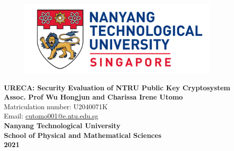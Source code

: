 \begin{titlepage}
\begin{figure}[!t]
\centering
\includegraphics[width = 4in]{Title/logo.png}\\[1in]
\end{figure}

\centering
\LARGE{\textbf{URECA: Security Evaluation of NTRU Public Key Cryptosystem}}\\[1.5in]

\large{\textbf{Assoc. Prof Wu Hongjun and Charissa Irene Utomo}}\\
\normalsize{Matriculation number: U2040071K}\\
\large{Email: \href{mailto:cutomo001@e.ntu.edu.sg}{cutomo001@e.ntu.edu.sg}} \\[0.5in]

\textbf{Nanyang Technological University\\School of Physical and Mathematical Sciences}\\[0.5in]

\textbf{2021}


\newpage
\end{titlepage}
